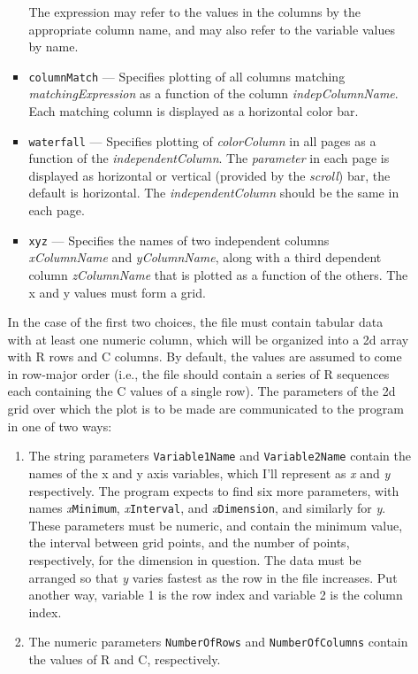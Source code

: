 \begin{itemize}
\begin{itemize}
\begin{itemize}
        The expression may refer to the values in the columns by the appropriate column name, and may
        also refer to the variable values by name.
        \item \verb|columnMatch| --- Specifies plotting of all columns matching {\em matchingExpression}
        as a function of the column {\em indepColumnName}.  Each matching column is displayed as a horizontal 
        color bar. 
        \item \verb|waterfall| --- Specifies plotting of {\em colorColumn} in all pages as a function of the
        {\em independentColumn}. The {\em parameter} in each page is displayed as horizontal or vertical (provided
        by the {\em scroll}) bar, the default is horizontal. The {\em independentColumn} should be the same in
        each page.
        \item \verb|xyz| --- Specifies the names of two independent columns {\em xColumnName} and {\em yColumnName}, along with 
          a third dependent column {\em zColumnName} that is plotted as a function of the others.
          The x and y values must form a grid.
        \end{itemize}

        In the case of the first two choices, the file must contain
tabular data with at least one numeric column, which will be organized
into a 2d array with R rows and C columns.  By default, the values are
assumed to come in row-major order (i.e., the file should contain a
series of R sequences each containing the C values of a single row).
The parameters of the 2d grid over which the plot is to be made are
communicated to the program in one of two ways:

\begin{enumerate}

\item The string parameters \verb|Variable1Name| and \verb|Variable2Name| contain the names of the 
x and y axis variables, which I'll represent as {\em x} and {\em y} respectively.  The program expects to find
six more parameters, with names {\em x}\verb|Minimum|, {\em x}\verb|Interval|, and {\em x}\verb|Dimension|,
and similarly for {\em y}.  These parameters must be numeric, and contain the minimum value, the interval
between grid points, and the number of points, respectively, for the dimension in question.
The data must be arranged so that {\em y} varies fastest as the row in the file increases.  Put another
way, variable 1 is the row index and variable 2 is the column index.
\item The numeric parameters \verb|NumberOfRows| and \verb|NumberOfColumns| contain the values of R and
C, respectively.
\end{enumerate}


\end{itemize}
\end{itemize}
